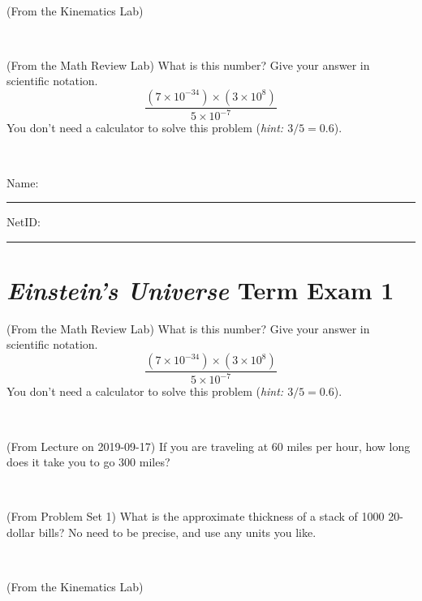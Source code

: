 \documentclass[12pt, letterpaper]{article}
\begin{document}
\vfill ~

\begin{problem} (From the Kinematics Lab)

\end{problem}


\vfill ~

\begin{problem} (From the Math Review Lab)
What is this number? Give your answer in scientific notation.
$$
\frac{(7\times10^{-34})\times(3\times10^8)}{5\times10^{-7}}
$$
You don't need a calculator to solve this problem (\textit{hint: $3/5=0.6$}).
\end{problem}


\vfill ~


\cleardoublepage



\noindent
Name: \rule[-1ex]{0.60\textwidth}{0.1pt}
NetID: \rule[-1ex]{0.20\textwidth}{0.1pt}

\section*{\textsl{Einstein's Universe} Term Exam 1}
\setcounter{problem}{1}


\begin{problem} (From the Math Review Lab)
What is this number? Give your answer in scientific notation.
$$
\frac{(7\times10^{-34})\times(3\times10^8)}{5\times10^{-7}}
$$
You don't need a calculator to solve this problem (\textit{hint: $3/5=0.6$}).
\end{problem}


\vfill ~

\begin{problem} (From Lecture on 2019-09-17)
If you are traveling at 60 miles per hour, how long does
it take you to go 300 miles?
\end{problem}


\vfill ~

\begin{problem} (From Problem Set 1)
What is the approximate thickness of a stack of 1000 20-dollar bills?
No need to be precise, and use any units you like.
\end{problem}


\vfill ~

\begin{problem} (From the Kinematics Lab)

\end{problem}


\vfill ~
\end{document}
